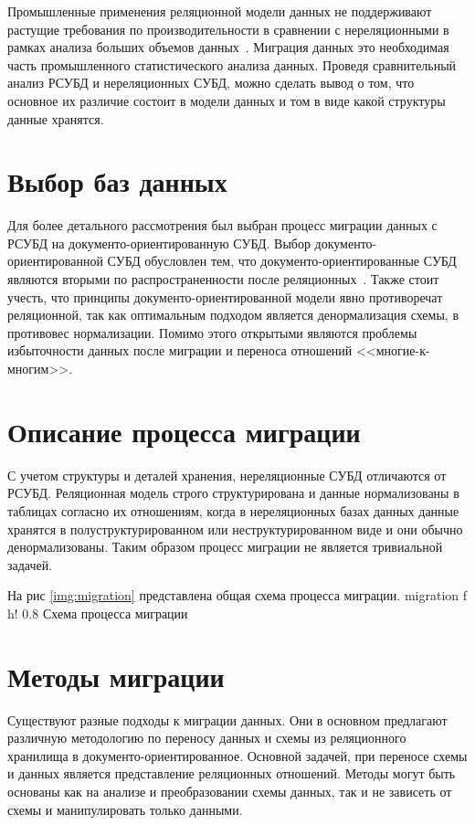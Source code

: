 Промышленные применения реляционной модели данных не поддерживают растущие требования по производительности в сравнении с нереляционными в рамках анализа больших объемов данных~\cite{migration}.
Миграция данных это необходимая часть промышленного статистического анализа данных.
Проведя сравнительный анализ РСУБД и нереляционных СУБД, можно сделать вывод о том, что основное их различие состоит в модели данных и том в виде какой структуры данные хранятся.

\section{Выбор баз данных}\label{sec:dbchoice}
Для более детального рассмотрения был выбран процесс миграции данных с РСУБД на документо-ориентированную СУБД.
Выбор документо-ориентированной СУБД обусловлен тем, что документо-ориентированные СУБД являются вторыми по распространенности после реляционных~\cite{db_rating}.
Также стоит учесть, что принципы документо-ориентированной модели явно противоречат реляционной, так как оптимальным подходом является денормализация схемы, в противовес нормализации.
Помимо этого открытыми являются проблемы избыточности данных после миграции и переноса отношений <<многие-к-многим>>.


\section{Описание процесса миграции}\label{sec:--2}
С учетом структуры и деталей хранения, нереляционные СУБД отличаются от РСУБД.
Реляционная модель строго структурирована и данные нормализованы в таблицах согласно их отношениям,
когда в нереляционных базах данных данные хранятся в полуструктурированном или неструктурированном виде и они обычно денормализованы.
Таким образом процесс миграции не является тривиальной задачей.

На рис \ref{img:migration} представлена общая схема процесса миграции.
  {migration} %
  {f} %
  {h!} %
  {0.8\textwidth} %
{Схема процесса миграции} %

\section{Методы миграции}
Существуют разные подходы к миграции данных.
Они в основном предлагают различную методологию по переносу данных и схемы из реляционного хранилища в документо-ориентированное.
Основной задачей, при переносе схемы и данных является представление реляционных отношений.
Методы могут быть основаны как на анализе и преобразовании схемы данных, так и не зависеть от схемы и манипулировать только данными.

